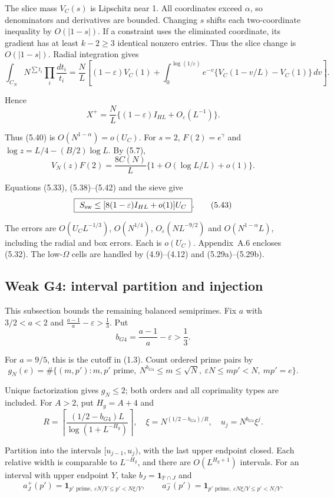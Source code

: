 The slice mass $V_C(s)$ is Lipschitz near 1.
All coordinates exceed $\alpha$, so denominators and derivatives are bounded.
Changing $s$ shifts each two-coordinate inequality by $O(|1-s|)$.
If a constraint uses the eliminated coordinate, its gradient has at least $k-2\ge3$ identical nonzero entries.
Thus the slice change is $O(|1-s|)$.
Radial integration gives
\[
 \int_{C_N}N^{\sum t_i}\prod_i\frac{dt_i}{t_i}
 =\frac NL\left[(1-\varepsilon)V_C(1)
 +\int_0^{\log(1/\varepsilon)}e^{-v}
       \{V_C(1-v/L)-V_C(1)\}\,dv\right].
\tag{5.41}
\]

Hence
\[
 X^+=\frac NL\{(1-\varepsilon)I_{HL}+O_\varepsilon(L^{-1})\}.
\tag{5.42}
\]

Thus (5.40) is $O(N^{1-\alpha})=o(U_C)$.
For $s=2$, $F(2)=e^\gamma$ and
$\log z=L/4-(B/2)\log L$.
By (5.7),
\[
 V_N(z)F(2)=\frac{8C(N)}L\{1+O(\log L/L)+o(1)\}.
\]

Equations (5.33), (5.38)--(5.42) and the sieve give
\[
 \boxed{\ S_{\rm sw}\le[8(1-\varepsilon)I_{HL}+o(1)]U_C\ }.
\tag{5.43}
\]

The errors are $O(U_CL^{-1/3})$, $O(N^{1/4})$,
$O_\varepsilon(NL^{-9/2})$ and $O(N^{1-\alpha}L)$,
including the radial and box errors.
Each is $o(U_C)$.
Appendix~A.6 encloses (5.32).
The low-$\Omega$ cells are handled by (4.9)--(4.12) and (5.29a)--(5.29b).

\subsection{Weak G4: interval partition and injection}

This subsection bounds the remaining balanced semiprimes.
Fix $a$ with $3/2<a<2$ and
$\frac{a-1}{a}-\varepsilon>\frac13$. Put
\[
 b_{G4}=\frac{a-1}{a}-\varepsilon>\frac13.
\]

For $a=9/5$, this is the cutoff in (1.3).
Count ordered prime pairs by
\[
 g_N(e)=\#\{(m,p'):m,p'\text{ prime},\ N^{b_{G4}}\le m\le\sqrt N,
                      \ \varepsilon N\le mp'<N,\ mp'=e\}.
\tag{5.44}
\]

Unique factorization gives $g_N\le2$;
both orders and all coprimality types are included.
For $A>2$, put $H_g=A+4$ and
\[
 R=\left\lceil\frac{(1/2-b_{G4})L}{\log(1+L^{-H_g})}\right\rceil,
 \quad \xi=N^{(1/2-b_{G4})/R},\quad u_j=N^{b_{G4}}\xi^j.
\tag{5.45}
\]

Partition into the intervals $[u_{j-1},u_j)$, with the last upper endpoint closed.
Each relative width is comparable to $L^{-H_g}$,
and there are $O(L^{H_g+1})$ intervals.
For an interval with upper endpoint $Y$, take $b_J=\mathbf1_{\mathbb P\cap J}$ and
\[
 a_J^+(p')=\mathbf1_{p'\text{ prime},\ \varepsilon N/Y\le p'<N\xi/Y},\qquad
 a_J^-(p')=\mathbf1_{p'\text{ prime},\ \varepsilon N\xi/Y\le p'<N/Y}.
\tag{5.46}
\]

